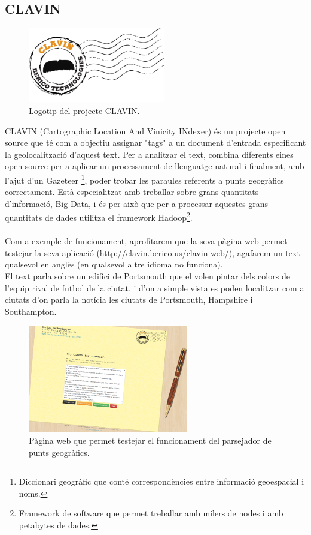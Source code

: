 \documentclass[12pt,a4paper,openright,oneside]{article}
\numberwithin{equation}{section}
\theoremstyle{definition}
\begin{document}
\subsection*{CLAVIN}
\begin{figure}[htbp]
\centering
\includegraphics[width=6cm]{clavin.png}
\caption{Logotip del projecte CLAVIN.}
\end{figure}
CLAVIN (Cartographic Location And Vinicity INdexer) és un projecte open source que té com a objectiu assignar "tags" a un document d'entrada especificant la geolocalització d'aquest text. Per a analitzar el text, combina diferents eines open source per a aplicar un processament de llenguatge natural i finalment, amb l'ajut d'un Gazeteer
\footnote{Diccionari geogràfic que conté correspondències entre informació geoespacial i noms.},
 poder trobar les paraules referents a punts geogràfics correctament. Està especialitzat amb treballar sobre grans quantitats d'informació, Big Data, i és per això que per a processar aquestes grans quantitats de dades utilitza el framework Hadoop\footnote{Framework de software que permet treballar amb milers de nodes i amb petabytes de dades.}.\\\\
Com a exemple de funcionament, aprofitarem que la seva pàgina web permet testejar la seva aplicació (http://clavin.berico.us/clavin-web/), agafarem un text qualsevol en anglès (en qualsevol altre idioma no funciona).\\
El text parla sobre un edifici de Portsmouth que el volen pintar dels colors de l'equip rival de futbol de la ciutat, i d'on a simple vista es poden localitzar com a ciutats d'on parla la notícia les ciutats de Portsmouth, Hampshire i Southampton.
\begin{figure}[htbp]
\centering
\includegraphics[width=7cm]{clavin-1.png}
\caption{Pàgina web que permet testejar el funcionament del parsejador de punts geogràfics.}
\end{figure}
\end{document}
